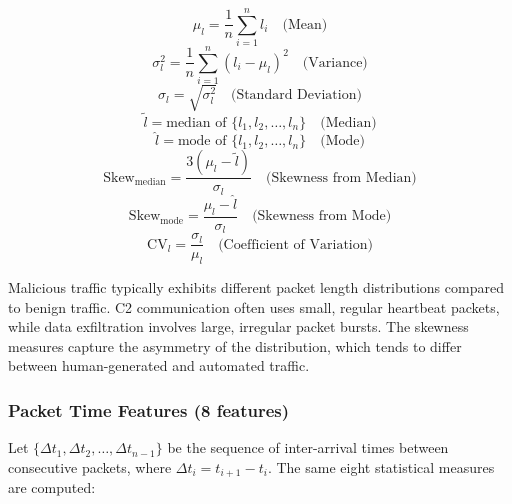 \documentclass[../Main.tex]{subfiles}
\begin{document}
\begin{equation}
\mu_l = \frac{1}{n} \sum_{i=1}^{n} l_i \quad \text{(Mean)}
\end{equation}
\begin{equation}
\sigma_l^2 = \frac{1}{n} \sum_{i=1}^{n} (l_i - \mu_l)^2 \quad \text{(Variance)}
\end{equation}
\begin{equation}
\sigma_l = \sqrt{\sigma_l^2} \quad \text{(Standard Deviation)}
\end{equation}
\begin{equation}
\tilde{l} = \text{median of } \{l_1, l_2, \ldots, l_n\} \quad \text{(Median)}
\end{equation}
\begin{equation}
\hat{l} = \text{mode of } \{l_1, l_2, \ldots, l_n\} \quad \text{(Mode)}
\end{equation}
\begin{equation}
\text{Skew}_{\text{median}} = \frac{3(\mu_l - \tilde{l})}{\sigma_l} \quad \text{(Skewness from Median)}
\end{equation}
\begin{equation}
\text{Skew}_{\text{mode}} = \frac{\mu_l - \hat{l}}{\sigma_l} \quad \text{(Skewness from Mode)}
\end{equation}
\begin{equation}
\text{CV}_l = \frac{\sigma_l}{\mu_l} \quad \text{(Coefficient of Variation)}
\end{equation}

Malicious traffic typically exhibits different packet length distributions compared to benign traffic. C2 communication often uses small, regular heartbeat packets, while data exfiltration involves large, irregular packet bursts. The skewness measures capture the asymmetry of the distribution, which tends to differ between human-generated and automated traffic.

\subsubsection{Packet Time Features (8 features)}

Let $\{\Delta t_1, \Delta t_2, \ldots, \Delta t_{n-1}\}$ be the sequence of inter-arrival times between consecutive packets, where $\Delta t_i = t_{i+1} - t_i$. The same eight statistical measures are computed:
\end{document}
